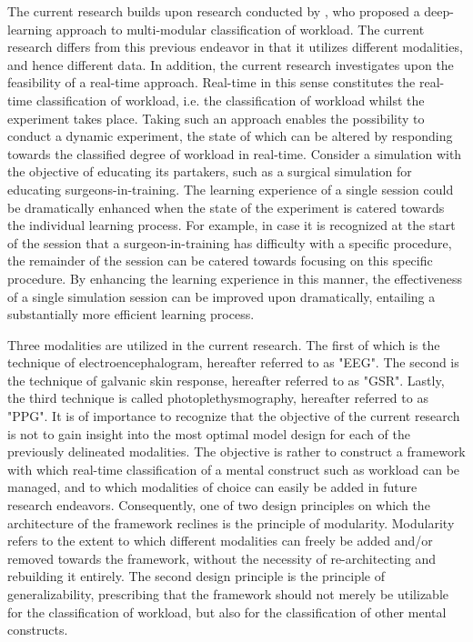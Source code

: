 \documentclass[12pt]{article}
\begin{document}
The current research builds upon research conducted by , who proposed a deep-learning approach to multi-modular classification of workload. The current research differs from this previous endeavor in that it utilizes different modalities, and hence different data. In addition, the current research investigates upon the feasibility of a real-time approach. Real-time in this sense constitutes the real-time classification of workload, i.e. the classification of workload whilst the experiment takes place. Taking such an approach enables the possibility to conduct a dynamic experiment, the state of which can be altered by responding towards the classified degree of workload in real-time. Consider a simulation with the objective of educating its partakers, such as a surgical simulation for educating surgeons-in-training. The learning experience of a single session could be dramatically enhanced when the state of the experiment is catered towards the individual learning process. For example, in case it is recognized at the start of the session that a surgeon-in-training has difficulty with a specific procedure, the remainder of the session can be catered towards focusing on this specific procedure. By enhancing the learning experience in this manner, the effectiveness of a single simulation session can be improved upon dramatically, entailing a substantially more efficient learning process.

Three modalities are utilized in the current research. The first of which is the technique of electroencephalogram, hereafter referred to as "EEG". The second is the technique of galvanic skin response, hereafter referred to as "GSR". Lastly, the third technique is called photoplethysmography, hereafter referred to as "PPG". It is of importance to recognize that the objective of the current research is not to gain insight into the most optimal model design for each of the previously delineated modalities. The objective is rather to construct a framework with which real-time classification of a mental construct such as workload can be managed, and to which modalities of choice can easily be added in future research endeavors. Consequently, one of two design principles on which the architecture of the framework reclines is the principle of modularity. Modularity refers to the extent to which different modalities can freely be added and/or removed towards the framework, without the necessity of re-architecting and rebuilding it entirely. The second design principle is the principle of generalizability, prescribing that the framework should not merely be utilizable for the classification of workload, but also for the classification of other mental constructs.
\end{document}
